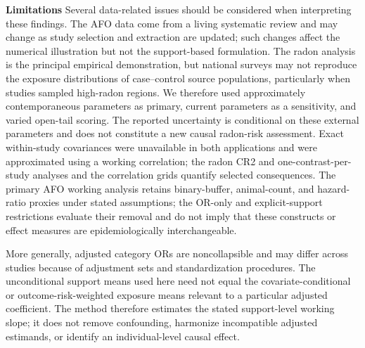 \documentclass[journal=rsm]{CUP-JNL-DTM}%
\theoremstyle{definition}
\numberwithin{equation}{section}
\begin{document}
\noindent\textbf{Limitations} 
Several data-related issues should be considered when interpreting these
findings. The AFO data come from a living systematic review and may change as
study selection and extraction are updated; such changes affect the numerical
illustration but not the support-based formulation. The radon analysis is the
principal empirical demonstration, but national surveys may not reproduce the
exposure distributions of case--control source populations, particularly when
studies sampled high-radon regions. We therefore used approximately
contemporaneous parameters as primary, current parameters as a sensitivity,
and varied open-tail scoring. The reported uncertainty is conditional on these
external parameters and does not constitute a new causal radon-risk assessment.
Exact within-study covariances were unavailable in both applications and were
approximated using a working correlation; the radon CR2 and one-contrast-per-
study analyses and the correlation grids quantify selected consequences. The
primary AFO working analysis retains binary-buffer, animal-count, and hazard-
ratio proxies under stated assumptions; the OR-only and explicit-support
restrictions evaluate their removal and do not imply that these constructs or
effect measures are epidemiologically interchangeable.

More generally, adjusted category ORs are noncollapsible and may differ across
studies because of adjustment sets and standardization procedures. The
unconditional support means used here need not equal the covariate-conditional
or outcome-risk-weighted exposure means relevant to a particular adjusted
coefficient. The method therefore estimates the stated support-level working
slope; it does not remove confounding, harmonize incompatible adjusted
estimands, or identify an individual-level causal effect.
\end{document}
